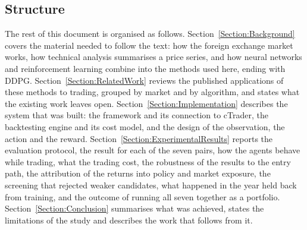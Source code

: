 \subsection{Structure}

The rest of this document is organised as follows. Section~\ref{Section:Background} covers the material needed to follow the text: how the foreign exchange market works, how technical analysis summarises a price series, and how neural networks and reinforcement learning combine into the methods used here, ending with DDPG. Section~\ref{Section:RelatedWork} reviews the published applications of these methods to trading, grouped by market and by algorithm, and states what the existing work leaves open. Section~\ref{Section:Implementation} describes the system that was built: the framework and its connection to cTrader, the backtesting engine and its cost model, and the design of the observation, the action and the reward. Section~\ref{Section:ExperimentalResults} reports the evaluation protocol, the result for each of the seven pairs, how the agents behave while trading, what the trading cost, the robustness of the results to the entry path, the attribution of the returns into policy and market exposure, the screening that rejected weaker candidates, what happened in the year held back from training, and the outcome of running all seven together as a portfolio. Section~\ref{Section:Conclusion} summarises what was achieved, states the limitations of the study and describes the work that follows from it.